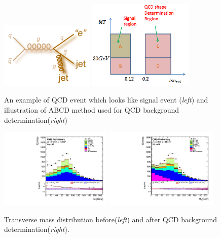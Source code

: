 \begin{figure}[htbp]
	\centering
		\includegraphics[width=0.4\textwidth]{Figures/QCD_diag.png}
		\includegraphics[width=0.45\textwidth]{Figures/QCD_AB.png}		
	\caption[QCD diagram and illustration of QCD background determination]{An example of QCD event which looks like signal event (\textit{left}) and illustration of ABCD method used for QCD background determination(\textit{right})}
	\label{fig:QCD}
\end{figure} 

\begin{figure}[htbp]
	\centering
		\includegraphics[width=0.48\textwidth]{Figures/VMt_QCD_before.pdf}
		\includegraphics[width=0.48\textwidth]{Figures/VMt_QCD_after.pdf}		
	\caption[Transverse mass distribution before and after QCD distribution determination.]{Transverse mass distribution before(\textit{left}) and after QCD background determination(\textit{right}).}
	\label{fig:QCD_dist}
\end{figure} 


